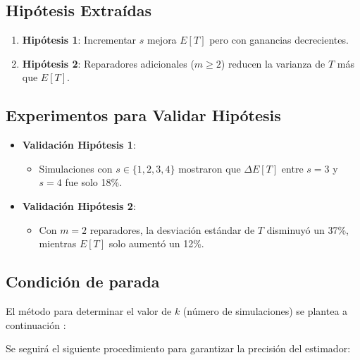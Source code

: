\documentclass[a4paper, 12pt]{article}
\begin{document}
\subsection*{Hipótesis Extraídas}
\begin{enumerate}
    \item \textbf{Hipótesis 1}: Incrementar \(s\) mejora \(E[T]\) pero con ganancias decrecientes.
    \item \textbf{Hipótesis 2}: Reparadores adicionales (\(m \geq 2\)) reducen la varianza de \(T\) más que \(E[T]\).
\end{enumerate}

\subsection*{Experimentos para Validar Hipótesis}
\begin{itemize}
    \item \textbf{Validación Hipótesis 1}:
    \begin{itemize}
        \item Simulaciones con \(s \in \{1,2,3,4\}\) mostraron que \(\Delta E[T]\) entre \(s=3\) y \(s=4\) fue solo 18\%.
    \end{itemize}
    
    \item \textbf{Validación Hipótesis 2}:
    \begin{itemize}
        \item Con \(m=2\) reparadores, la desviación estándar de \(T\) disminuyó un 37\%, mientras \(E[T]\) solo aumentó un 12\%.
    \end{itemize}
    

\end{itemize}









\subsection{Condición de parada}

El método para determinar el valor de $ k $ (número de simulaciones) se plantea a continuación :

Se seguirá el siguiente procedimiento para garantizar la precisión del estimador:
\end{document}
